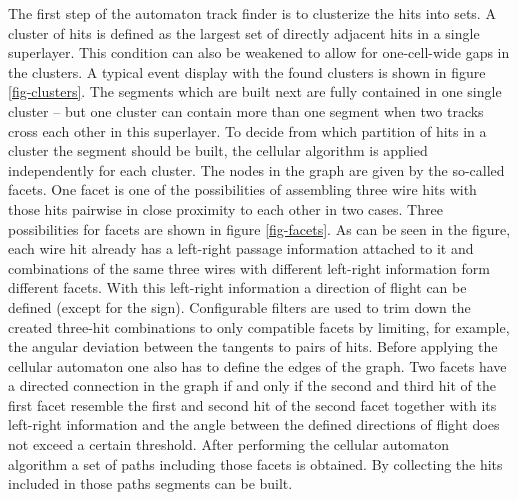 The first step of the automaton track finder is to clusterize the hits into sets. A cluster of hits is defined as the largest set of directly adjacent hits in a single superlayer. This condition can also be weakened to allow for one-cell-wide gaps in the clusters. A typical event display with the found clusters is shown in figure \ref{fig-clusters}. The segments which are built next are fully contained in one single cluster -- but one cluster can contain more than one segment when two tracks cross each other in this superlayer. To decide from which partition of hits in a cluster the segment should be built, the cellular algorithm is applied independently for each cluster. The nodes in the graph are given by the so-called facets. One facet is one of the possibilities of assembling three wire hits with those hits pairwise in close proximity to each other in two cases. Three possibilities for facets are shown in figure \ref{fig-facets}. As can be seen in the figure, each wire hit already has a left-right passage information attached to it and combinations of the same three wires with different left-right information form different facets. With this left-right information a direction of flight can be defined (except for the sign). Configurable filters are used to trim down the created three-hit combinations to only compatible facets by limiting, for example, the angular deviation between the tangents to pairs of hits. Before applying the cellular automaton one also has to define the edges of the graph. Two facets have a directed connection in the graph if and only if the second and third hit of the first facet resemble the first and second hit of the second facet together with its left-right information and the angle between the defined directions of flight does not exceed a certain threshold. After performing the cellular automaton algorithm a set of paths including those facets is obtained. By collecting the hits included in those paths segments can be built.

